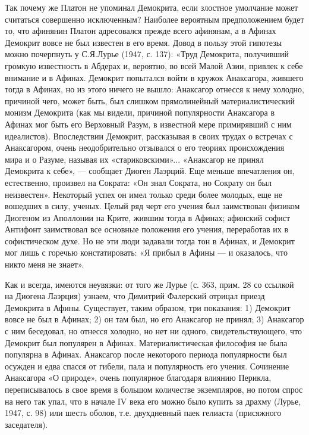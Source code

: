 Так почему же Платон не упоминал Демокрита, если злостное умолчание
может считаться совершенно исключенным? Наиболее вероятным
предположением будет то, что афинянин Платон адресовался прежде всего
афинянам, а в Афинах Демокрит вовсе не был известен в его время. Довод
в пользу этой гипотезы можно почерпнуть у С.Я.Лурье (1947, с. 137):
«Труд Демокрита, получивший громкую известность в Абдерах и, вероятно,
во всей Малой Азии, привлек к себе внимание и в Афинах. Демокрит
попытался войти в кружок Анаксагора, жившего тогда в Афинах, но из
этого ничего не вышло: Анаксагор отнесся к нему холодно, причиной
чего, может быть, был слишком прямолинейный материалистический монизм
Демокрита (как мы видели, причиной популярности Анаксагора в Афинах
мог быть его Верховный Разум, в известной мере примирявший с ним
идеалистов). Впоследствии Демокрит, рассказывая в своих трудах о
встречах с Анаксагором, очень неодобрительно отзывался о его теориях
происхождения мира и о Разуме, называя их «стариковскими»...
«Анаксагор не принял Демокрита к себе», --- сообщает Диоген Лаэрций.
Еще меньше впечатления он, естественно, произвел на Сократа: «Он знал
Сократа, но Сократу он был неизвестен». Некоторый успех он имел только
среди более молодых, еще не вошедших в силу, ученых. Целый ряд черт
его учения был заимствован физиком Диогеном из Аполлонии на Крите,
жившим тогда в Афинах; афинский софист Антифонт заимствовал все
основные положения его учения, переработав их в софистическом духе. Но
не эти люди задавали тогда тон в Афинах, и Демокрит мог лишь с горечью
констатировать: «Я прибыл в Афины --- и оказалось, что никто меня не
знает».

Как и всегда, имеются неувязки: от того же Лурье (с. 363, прим. 28 со
ссылкой на Диогена Лаэрция) узнаем, что Димитрий Фалерский отрицал
приезд Демокрита в Афины. Существует, таким образом, три показания: 1)
Демокрит вовсе не был в Афинах; 2) он там был, но его Анаксагор не
принял; 3) Анаксагор с ним беседовал, но отнесся холодно, но нет ни
одного, свидетельствующего, что Демокрит был популярен в Афинах.
Материалистическая философия не была популярна в Афинах. Анаксагор
после некоторого периода популярности был осужден и едва спасся от
гибели, пала и популярность его учения. Сочинение Анаксагора «О
природе», очень популярное благодаря влиянию Перикла, переписывалось в
свое время в большом количестве экземпляров, но потом спрос на него
так упал, что в начале IV века его можно было купить за драхму (Лурье,
1947, с. 98) или шесть оболов, т.е. двухдневный паек гелиаста
(присяжного заседателя).

